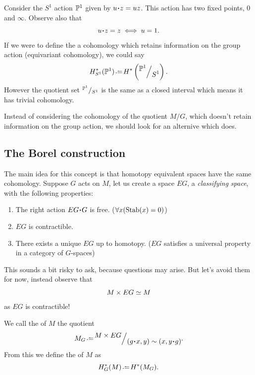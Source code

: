 \documentclass[12pt]{memoir}
\begin{document}
\begin{Ex}
    Consider the $S^1$ action $\mathbb{P}^1$ given by $u\. z=uz$. This action has two fixed points, $0$ and $\infty$. Observe also that 
    $$u\.z=z\iff u=1.$$
    If we were to define the a cohomology which retains information on the group action (equivariant cohomology), we could say 
    $$H_{S^1}^\ast(\bP^1)\defeq H^\ast\left(\quot{\bP^1}{S^1}\right).$$
    However the quotient set $\quot{\bP^1}{S^1}$ is the same as a closed interval which means it has trivial cohomology.
\end{Ex}

Instead of considering the cohomology of the quotient $M/G$, which doesn't retain information on the group action, we should look for an alternive which does.

\subsection{The Borel construction}

The main idea for this concept is that homotopy equivalent spaces have the same cohomology. Suppose $G$ acts on $M$, let us create a space $EG$, a \emph{classifying space}, with the following properties:

\begin{enumerate}
    \item The right action $EG\. G$ is free. ($\forall x(\operatorname{Stab}(x)=0)$)
    \item $EG$ is contractible. 
    \item There exists a unique $EG$ up to homotopy. ($EG$ satisfies a universal property in a category of $G$-spaces)
\end{enumerate}

This sounds a bit risky to ask, because questions may arise. But let's avoid them for now, instead observe that 
$$M\times EG\simeq M$$
as $EG$ is contractible! 

\begin{Def}
    We call the  of $M$ the quotient
    $$M_G\defeq\quot{M\x EG}{(g\.x,y)\sim(x,y\.g)}.$$
    From this we define the  of $M$ as 
    $$H_G^\ast(M)\defeq H^\ast(M_G).$$
\end{Def}
\end{document}
